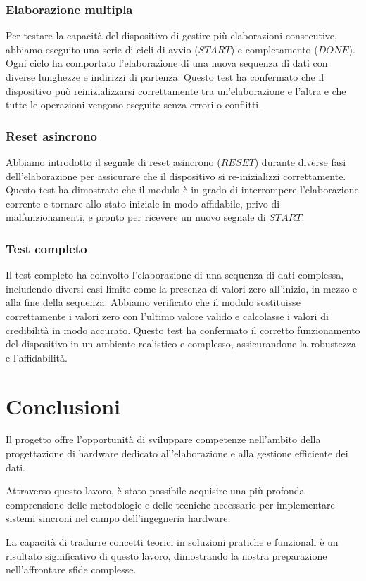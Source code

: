 \subsubsection{Elaborazione multipla}
  Per testare la capacità del dispositivo di gestire più elaborazioni consecutive, abbiamo eseguito una serie di cicli di avvio ($START$) e completamento ($DONE$).
  Ogni ciclo ha comportato l'elaborazione di una nuova sequenza di dati con diverse lunghezze e indirizzi di partenza.
  Questo test ha confermato che il dispositivo può reinizializzarsi correttamente tra un'elaborazione e l'altra e che tutte le operazioni vengono eseguite senza errori o conflitti.
\subsubsection{Reset asincrono}
  Abbiamo introdotto il segnale di reset asincrono ($RESET$) durante diverse fasi dell'elaborazione per assicurare che il dispositivo si re-inizializzi correttamente.
  Questo test ha dimostrato che il modulo è in grado di interrompere l'elaborazione corrente e tornare allo stato iniziale in modo affidabile, privo di malfunzionamenti, e pronto per ricevere un nuovo segnale di $START$.
\subsubsection{Test completo}
  Il test completo ha coinvolto l'elaborazione di una sequenza di dati complessa, includendo diversi casi limite come la presenza di valori zero all'inizio, in mezzo e alla fine della sequenza.
  Abbiamo verificato che il modulo sostituisse correttamente i valori zero con l'ultimo valore valido e calcolasse i valori di credibilità in modo accurato.
  Questo test ha confermato il corretto funzionamento del dispositivo in un ambiente realistico e complesso, assicurandone la robustezza e l'affidabilità.
\pagebreak

\section{Conclusioni}
  \par Il progetto offre l'opportunità di sviluppare competenze nell'ambito della progettazione di hardware dedicato all'elaborazione e alla gestione efficiente dei dati. 
  \par Attraverso questo lavoro, è stato possibile acquisire una più profonda comprensione delle metodologie e delle tecniche necessarie per implementare sistemi sincroni nel campo dell'ingegneria hardware. 
  \par La capacità di tradurre concetti teorici in soluzioni pratiche e funzionali è un risultato significativo di questo lavoro, dimostrando la nostra preparazione nell'affrontare sfide complesse.
\pagebreak
